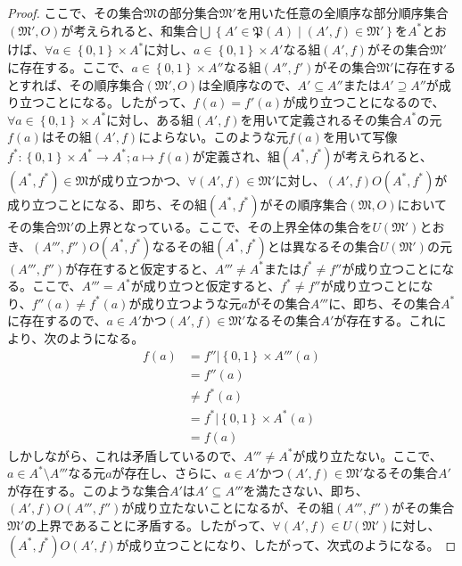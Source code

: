 \documentclass[dvipdfmx]{jsarticle}
\begin{document}
\begin{proof}
ここで、その集合$\mathfrak{M}$の部分集合$\mathfrak{M}'$を用いた任意の全順序な部分順序集合$\left( \mathfrak{M}',O \right)$が考えられると、和集合$\bigcup_{} \left\{ A'\in \mathfrak{P}(A) \middle| \left( A',f \right) \in \mathfrak{M}' \right\}$を$A^{*}$とおけば、$\forall a \in \left\{ 0,1 \right\} \times A^{*}$に対し、$a \in \left\{ 0,1 \right\} \times A'$なる組$\left( A',f \right)$がその集合$\mathfrak{M}'$に存在する。ここで、$a \in \left\{ 0,1 \right\} \times A''$なる組$\left( A'',f' \right)$がその集合$\mathfrak{M}'$に存在するとすれば、その順序集合$\left( \mathfrak{M}',O \right)$は全順序なので、$A' \subseteq A''$または$A' \supseteq A''$が成り立つことになる。したがって、$f(a) = f'(a)$が成り立つことになるので、$\forall a \in \left\{ 0,1 \right\} \times A^{*}$に対し、ある組$\left( A',f \right)$を用いて定義されるその集合$A^{*}$の元$f(a)$はその組$\left( A',f \right)$によらない。このような元$f(a)$を用いて写像$f^{*}:\left\{ 0,1 \right\} \times A^{*} \rightarrow A^{*};a \mapsto f(a)$が定義され、組$\left( A^{*},f^{*} \right)$が考えられると、$\left( A^{*},f^{*} \right)\in \mathfrak{M}$が成り立つかつ、$\forall\left( A',f \right) \in \mathfrak{M}'$に対し、$\left( A',f \right)O\left( A^{*},f^{*} \right)$が成り立つことになる、即ち、その組$\left( A^{*},f^{*} \right)$がその順序集合$\left( \mathfrak{M,}O \right)$においてその集合$\mathfrak{M}'$の上界となっている。ここで、その上界全体の集合を$U\left( \mathfrak{M}' \right)$とおき、$\left( A''',f'' \right)O\left( A^{*},f^{*} \right)$なるその組$\left( A^{*},f^{*} \right)$とは異なるその集合$U\left( \mathfrak{M}' \right)$の元$\left( A''',f'' \right)$が存在すると仮定すると、$A''' \neq A^{*}$または$f^{*} \neq f''$が成り立つことになる。ここで、$A''' = A^{*}$が成り立つと仮定すると、$f^{*} \neq f''$が成り立つことになり、$f''(a) \neq f^{*}(a)$が成り立つような元$a$がその集合$A'''$に、即ち、その集合$A^{*}$に存在するので、$a \in A'$かつ$\left( A',f \right) \in \mathfrak{M}'$なるその集合$A'$が存在する。これにより、次のようになる。
\begin{align*}
f(a) &= f''|\left\{ 0,1 \right\} \times A'''(a)\\
&= f''(a)\\
&\neq f^{*}(a)\\
&= f^{*}|\left\{ 0,1 \right\} \times A^{*}(a)\\
&= f(a)
\end{align*}
しかしながら、これは矛盾しているので、$A''' \neq A^{*}$が成り立たない。ここで、$a \in A^{*} \setminus A'''$なる元$a$が存在し、さらに、$a \in A'$かつ$\left( A',f \right) \in \mathfrak{M}'$なるその集合$A'$が存在する。このような集合$A'$は$A' \subseteq A'''$を満たさない、即ち、$\left( A',f \right)O\left( A''',f'' \right)$が成り立たないことになるが、その組$\left( A''',f'' \right)$がその集合$\mathfrak{M}'$の上界であることに矛盾する。したがって、$\forall\left( A',f \right) \in U\left( \mathfrak{M}' \right)$に対し、$\left( A^{*},f^{*} \right)O\left( A',f \right)$が成り立つことになり、したがって、次式のようになる。

\end{proof}
\end{document}
